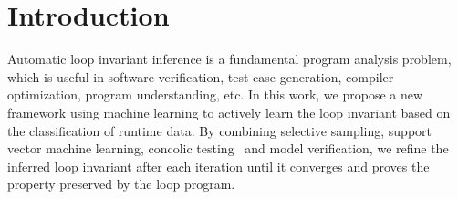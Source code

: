 
\section{Introduction} %
\label{sec:introduction}

Automatic loop invariant inference is a fundamental program analysis problem, 
which is useful in software verification, test-case generation, 
compiler optimization, program understanding, etc. 
In this work, we propose a new framework using machine learning 
to actively learn the loop invariant based on the classification of runtime data. 
By combining selective sampling, support vector machine learning, 
concolic testing~\cite{sen2007concolic} and model verification, 
we refine the inferred loop invariant after each iteration 
until it converges and proves the property preserved by the loop program. 

